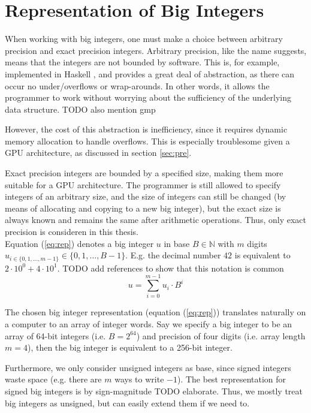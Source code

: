 \section{Representation of Big Integers}
When working with big integers, one must make a choice between arbitrary precision and exact precision integers. Arbitrary precision, like the name suggests, means that the integers are not bounded by software. This is, for example, implemented in Haskell \cite{marlow2010haskell}, and provides a great deal of abstraction, as there can occur no under/overflows or wrap-arounds. In other words, it allows the programmer to work without worrying about the sufficiency of the underlying data structure. {\color{red} TODO also mention gmp}

However, the cost of this abstraction is inefficiency, since it requires dynamic memory allocation to handle overflows. This is especially troublesome given a GPU architecture, as discussed in section \ref{sec:pre}.

Exact precision integers are bounded by a specified size, making them more suitable for a GPU architecture. The programmer is still allowed to specify integers of an arbitrary size, and the size of integers can still be changed (by means of allocating and copying to a new big integer), but the exact size is always known and remains the same after arithmetic operations. Thus, only exact precision is consideren in this thesis.\\

Equation (\ref{eq:rep}) denotes a big integer $u$ in base $B \in \mathbb{N}$ with $m$ digits $u_{i\in \{0,1,\dots,m-1\}}\in\{0,1,\dots,B-1\}$. E.g. the decimal number $42$ is equivalent to $2\cdot 10^0+4\cdot 10^1$. {\color{red} TODO add references to show that this notation is common}
\begin{equation}
\label{eq:rep}
u = \sum_{i=0}^{m-1}u_i\cdot B^{i}
\end{equation}

The chosen big integer representation (equation (\ref{eq:rep})) translates naturally on a computer to an array of integer words. Say we specify a big integer to be an array of 64-bit integers (i.e. $B = 2^{64}$) and precision of four digits (i.e. array length $m = 4$), then the big integer is equivalent to a 256-bit integer.

Furthermore, we only consider unsigned integers as base, since signed integers waste space (e.g. there are $m$ ways to write $-1$). The best representation for signed big integers is by sign-magnitude {\color{red} TODO elaborate}. Thus, we mostly treat big integers as unsigned, but can easily extend them if we need to.


